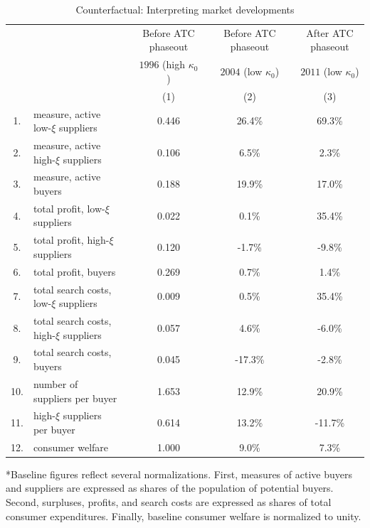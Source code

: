 \begin{table}[H]
\caption{Counterfactual: Interpreting market developments}
\label{tab:experiments}\centering
\resizebox{\textwidth}{!} {

\begin{tabular}{ccccccccc}
\hline\hline
&  &  &  & Before ATC phaseout &  & Before ATC phaseout &  & After ATC phaseout \\
&  &  &  & $1996$ (high $\kappa_0$) &  & $2004$ (low $\kappa_0$) &  & $2011$ (low $\kappa_0$) \\
\hline
&  &  &  & (1) &  & (2) &  & (3) \\
\hline
1. & \multicolumn{2}{l}{measure, active low-$\xi$ suppliers} &  & 0.446 &  & 26.4\% &  & 69.3\% \\
2. & \multicolumn{2}{l}{measure, active high-$\xi$ suppliers} &  & 0.106 &  & 6.5\% &  & 2.3\% \\
3. & \multicolumn{2}{l}{measure, active buyers} &  & 0.188 &  & 19.9\% &  & 17.0\% \\
4. & \multicolumn{2}{l}{total profit, low-$\xi$ suppliers} &  & 0.022 &  & 0.1\% &  & 35.4\% \\
5. & \multicolumn{2}{l}{total profit, high-$\xi$ suppliers} &  & 0.120 &  & -1.7\% &  & -9.8\% \\
6. & \multicolumn{2}{l}{total profit, buyers} &  & 0.269 &  & 0.7\% &  & 1.4\% \\
7. & \multicolumn{2}{l}{total search costs, low-$\xi$ suppliers} &  & 0.009 &  & 0.5\% &  & 35.4\% \\
8. & \multicolumn{2}{l}{total search costs, high-$\xi$ suppliers} &  & 0.057 &  & 4.6\% &  & -6.0\% \\
9. & \multicolumn{2}{l}{total search costs, buyers} &  & 0.045 &  & -17.3\% &  & -2.8\% \\
10. & \multicolumn{2}{l}{number of suppliers per buyer} &  & 1.653 &  & 12.9\% &  & 20.9\% \\
11. & \multicolumn{2}{l}{high-$\xi$ suppliers per buyer} &  & 0.614 &  & 13.2\% &  & -11.7\% \\
12. & \multicolumn{2}{l}{consumer welfare} &  & 1.000 &  & 9.0\% &  & 7.3\% \\
\hline
\end{tabular}
}
\begin{tablenotes}\footnotesize
\medskip
\item [a] *Baseline figures reflect several normalizations. First, measures of active buyers and suppliers are expressed as shares of the population of potential buyers. Second, surpluses, profits, and search costs are expressed as shares of total consumer expenditures. Finally, baseline consumer welfare is normalized to unity.
\end{tablenotes}
\end{table}
